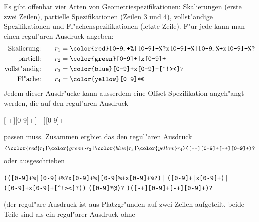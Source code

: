 \begin{loesung}
Es gibt offenbar vier Arten von Geometriespezifikationen: Skalierungen 
(erste zwei Zeilen),
partielle Spezifikationen (Zeilen 3 und 4), vollst"andige Spezifikationen
und Fl"achenspezifikationen (letzte Zeile).
F"ur jede kann man einen regul"aren Ausdruck angeben:
\begin{align*}
\text{Skalierung:}\qquad&r_1 = \texttt{\color{red}[0-9]+\%|[0-9]+\%?x[0-9]+\%|[0-9]\%+x[0-9]+\%?}
\\
\text{partiell:}\qquad&r_2 = \texttt{\color{green}[0-9]+|x[0-9]+}
\\
\text{vollst"andig:}\qquad&r_3 = \texttt{\color{blue}[0-9]+x[0-9]+[\^{}!><]?}
\\
\text{Fl"ache:}\qquad&r_4 = \texttt{\color{yellow}[0-9]*@}
\end{align*}
Jedem dieser Ausdr"ucke kann ausserdem eine Offset-Spezifikation angeh"angt
werden, die auf den regul"aren Ausdruck
\begin{center}
[-+][0-9]+[-+][0-9]+
\end{center}
passen muss. Zusammen ergbiet das den regul"aren Ausdruck
\[
\texttt{(}
{\color{red} r_1}
\texttt{|}
{\color{green} r_2}
\texttt{|}
{\color{blue} r_3}
\texttt{|}
{\color{yellow} r_4}
\texttt{)([-+][0-9]+[-+][0-9]+)?}
\]
oder ausgeschrieben
\begin{center}
\texttt{(({\color{red}[0-9]+\%|[0-9]+\%?x[0-9]+\%|[0-9]\%+x[0-9]+\%?})|}%
\texttt{({\color{green}[0-9]+|x[0-9]+})|}\\
\texttt{({\color{blue}[0-9]+x[0-9]+[\^{}!><]?}))}%
\texttt{({\color{yellow}[0-9]*@})?}%
\texttt{)([-+][0-9]+[-+][0-9]+)?}
\end{center}
(der regul"are Ausdruck ist aus Platzgr"unden auf zwei Zeilen aufgeteilt,
beide Teile sind als ein regul"arer Ausdruck ohne 
\end{loesung}

